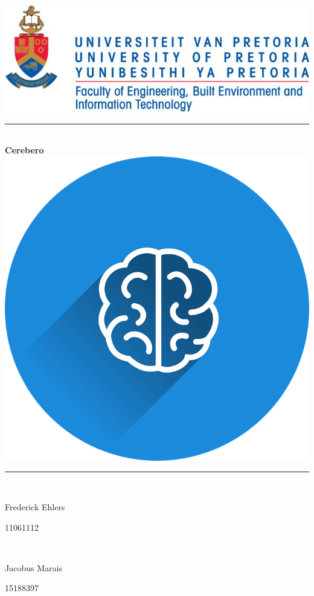 \begin{titlepage}
	
	\begin{center}
		\includegraphics[width=0.7\linewidth]{Images/uniLogo.jpg}\\
		\rule{\linewidth}{0.5mm} \\[0.5cm]
		{ \huge \bfseries Cerebero}\\[0.3cm]
		\includegraphics[width=0.2\linewidth]{Images/cerebero.png}\\
		\rule{\linewidth}{0.6mm} \\[0.5cm] 		
  
		
		\begin{minipage}{0.4\textwidth}
			\begin{flushleft} \large
				Frederick Ehlers 
			\end{flushleft}
		\end{minipage}
		\begin{minipage}{0.4\textwidth}
			\begin{flushright} \large
				11061112
			\end{flushright}
		\end{minipage} \\[0.2cm]

		\begin{minipage}{0.4\textwidth}
			\begin{flushleft} \large
				 Jacobus Marais
			\end{flushleft}
		\end{minipage}
		\begin{minipage}{0.4\textwidth}
			\begin{flushright} \large
				15188397 
			\end{flushright}
		\end{minipage}\\[0.2cm]


\end{center}
\end{titlepage}
